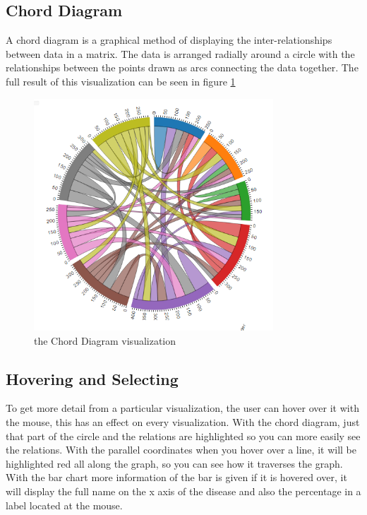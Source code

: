 \documentclass[a4paper,twoside,11pt]{article}
\begin{document}
\subsection{Chord Diagram}
A chord diagram is a graphical method of displaying the inter-relationships between data in a matrix. The data is arranged radially around a circle with the relationships between the points drawn as arcs connecting the data together. The full result of this visualization can be seen in figure \ref{fig:Chord}\newline
\begin{figure}[h]
\begin{center}
    \includegraphics[width=0.8\textwidth]{images/chordDiagramSolo.PNG}
    \caption{the Chord Diagram visualization}
    \label{fig:Chord}
\end{center}
\end{figure}
\newpage
\subsection{Hovering and Selecting}
To get more detail from a particular visualization, the user can hover over it with the mouse, this has an effect on every visualization. \newline
With the chord diagram, just that part of the circle and the relations are highlighted so you can more easily see the relations. \newline
With the parallel coordinates when you hover over a line, it will be highlighted red all along the graph, so you can see how it traverses the graph. \newline
With the bar chart more information of the bar is given if it is hovered over, it will display the full name on the x axis of the disease and also the percentage in a label located at the mouse.
\end{document}
